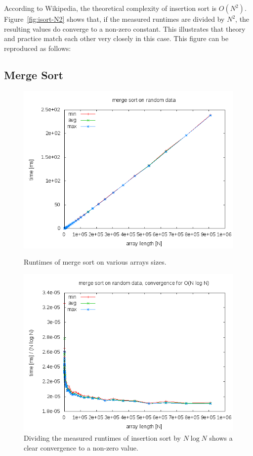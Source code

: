 \documentclass[a4paper,10pt]{article}
\begin{document}
\small\noindent

\normalsize

According to Wikipedia, the theoretical complexity of insertion sort is $O(N^2)$.
Figure~\ref{fig:isort-N2} shows that, if the measured runtimes are divided by $N^2$, the resulting values do converge to a non-zero constant.
This illustrates that theory and practice match each other very closely in this case.
This figure can be reproduced as follows:

\small\noindent

\normalsize



\subsection*{Merge Sort}

\begin{figure}
  \centering
  \includegraphics[width=0.7\columnwidth]{examples/msort-example.png}
  \caption{
    Runtimes of merge sort on various arrays sizes.
  }\label{fig:msort}
  \vspace{\baselineskip}
  \includegraphics[width=0.7\columnwidth]{examples/msort-example-NlogN.png}
  \caption{
    Dividing the measured runtimes of insertion sort by $N \log N$ shows a clear convergence to a non-zero value.
  }\label{fig:msort-NlogN}
\end{figure}
\end{document}
